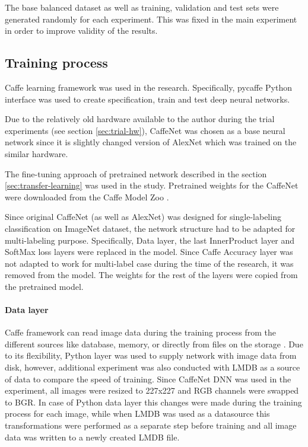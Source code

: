     The base balanced dataset as well as training, validation and test sets were generated randomly for each experiment. This was fixed in the main experiment in order to improve validity of the results.
    
    \subsection{Training process}
    \label{sec:trial-training}
    Caffe \cite{Caffe} learning framework was used in the research. Specifically, pycaffe \cite{pycaffe} Python interface was used to create specification, train and test deep neural networks.
    
    Due to the relatively old hardware available to the author during the trial experiments (see section \ref{sec:trial-hw}), CaffeNet \cite{CaffeNet} was chosen as a base neural network since it is slightly changed version of AlexNet \cite{Krizhevsky2012ImageNetDNN} which was trained on the similar hardware.
    
    The fine-tuning approach of pretrained network described in the section \ref{sec:transfer-learning} was used in the study. Pretrained weights for the CaffeNet were downloaded from the Caffe Model Zoo \cite{CaffeModelZoo}.
    
    Since original CaffeNet (as well as  AlexNet) was designed for single-labeling classification on ImageNet dataset, the network structure had to be adapted for multi-labeling purpose. Specifically, Data layer, the last InnerProduct layer and SoftMax loss layers were replaced in the model. Since Caffe Accuracy layer was not adapted to work for multi-label case during the time of the research, it was removed from the model. The weights for the rest of the layers were copied from the pretrained model.
    
    \paragraph{Data layer}
    Caffe framework can read image data during the training process from the different sources like database, memory, or directly from files on the storage \cite{CaffeLayerCatalogue}. Due to its flexibility, Python layer was used to supply network with image data from disk, however, additional experiment was also conducted with LMDB \cite{lmdb} as a source of data to compare the speed of training. Since CaffeNet DNN was used in the experiment, all images were resized to 227x227 and RGB channels were swapped to BGR. In case of Python data layer this changes were made during the training process for each image, while when LMDB was used as a datasource this transformations were performed as a separate step before training and all image data was written to a newly created LMDB file.
    
